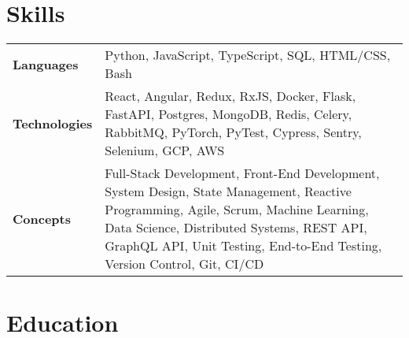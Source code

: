 \documentclass{ethan_cv}
\begin{document}
\section{Skills}
    \small
     \begin{tabular}{p{2.25cm} p{16cm}}
         \textbf{Languages} & Python, JavaScript, TypeScript, SQL, HTML/CSS, Bash \\ 
         \textbf{Technologies} & React, Angular, Redux, RxJS, Docker, Flask, FastAPI, Postgres, MongoDB, Redis, Celery, RabbitMQ, PyTorch, PyTest, Cypress, Sentry, Selenium, GCP, AWS \\
         \textbf{Concepts} & Full-Stack Development, Front-End Development, System Design, State Management, Reactive Programming, Agile, Scrum, Machine Learning, Data Science, Distributed Systems, REST API, GraphQL API, Unit Testing, End-to-End Testing, Version Control, Git, CI/CD
     \end{tabular}
     \vspace{+3mm}


\section{Education}
\end{document}
